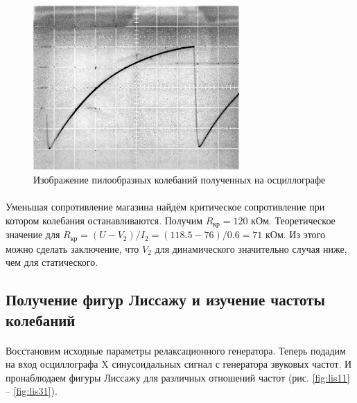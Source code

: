 \documentclass[a4paper,12pt]{article} %
\begin{document}
\begin{figure}
\begin{center}
\includegraphics[width=0.7\textwidth]{sawtooth.png}
\caption{Изображение пилообразных колебаний полученных на осциллографе}
\label{fig:saw}
\end{center}
\end{figure}

\paragraph{} Уменьшая сопротивление магазина найдём критическое сопротивление при котором колебания останавливаются. Получим $R_\text{кр} = 120$ кОм. Теоретическое значение для $R_\text{кр} = (U - V_2) / I_2 = (118.5 - 76) / 0.6 = 71$ кОм. Из этого можно сделать заключение, что $V_2$ для динамического значительно случая ниже, чем для статического.

\subsection{Получение фигур Лиссажу и изучение частоты колебаний}

\paragraph{} Восстановим исходные параметры релаксационного генератора. Теперь подадим на вход осциллографа X синусоидальных сигнал с генератора звуковых частот. И пронаблюдаем фигуры Лиссажу для различных отношений частот (рис. \ref{fig:lis11} -- \ref{fig:lis31}).
\end{document}
